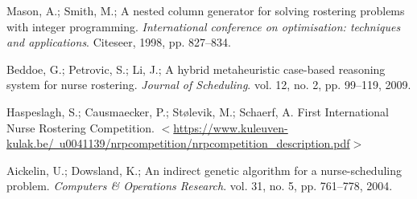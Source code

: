 \documentclass[a4paper, 14pt]{article}
\begin{document}
\begin{thebibliography}{9}
 	 Mason, A.; Smith, M.; A nested column generator for solving rostering problems with integer programming. \emph{International conference on optimisation: techniques and applications}. Citeseer, 1998, pp. 827–834.

 	Beddoe, G.; Petrovic, S.; Li, J.; A hybrid metaheuristic case-based reasoning system for nurse rostering.  \emph{Journal of Scheduling}. vol. 12, no. 2, pp. 99–119, 2009.

	Haspeslagh, S.; Causmaecker, P.; Stølevik, M.; Schaerf, A. First International Nurse Rostering Competition.
	 \href{https://www.kuleuven-kulak.be/~u0041139/nrpcompetition/nrpcompetition\_description.pdf}{$<$https://www.kuleuven-kulak.be/~u0041139/nrpcompetition/nrpcompetition\_description.pdf$>$}
	 
	Aickelin, U.; Dowsland, K.; An indirect genetic algorithm for a nurse-scheduling problem. \emph{Computers \& Operations Research}. vol. 31, no. 5, pp. 761–778, 2004.

	 
\end{thebibliography}


\end{document}
